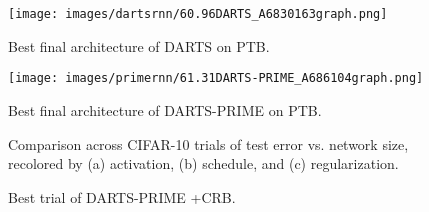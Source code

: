 \documentclass[letterpaper]{article} \usepackage{aaai22}  \usepackage{times}  \usepackage{helvet}  \usepackage{courier}  \usepackage[hyphens]{url}  \usepackage{graphicx} \urlstyle{rm} \def\UrlFont{\rm}  \usepackage{natbib}  \usepackage{caption} \DeclareCaptionStyle{ruled}{labelfont=normalfont,labelsep=colon,strut=off} \frenchspacing  \setlength{\pdfpagewidth}{8.5in}  \setlength{\pdfpageheight}{11in}  \usepackage{algorithm}
\begin{document}
\begin{figure}[thp!]
\texttt{[image: images/dartsrnn/60.96DARTS\_A6830163graph.png]}
\caption{Best final architecture of DARTS on PTB.} \label{fig:dartsrnn}
\end{figure}

\begin{figure}[thp!]
\texttt{[image: images/primernn/61.31DARTS-PRIME\_A686104graph.png]}
\caption{Best final architecture of DARTS-PRIME on PTB.} \label{fig:primernn}
\end{figure}

\begin{figure}[b!]
\centering
\begin{minipage}{\linewidth}
\centering
{} 
\end{minipage}\par
\begin{minipage}{\linewidth}
\centering
{} 
\end{minipage}\par
\begin{minipage}{\linewidth}
\centering
{} 
\end{minipage}\par
\caption{Comparison across CIFAR-10 trials of test error vs. network size, recolored by (a) activation, (b) schedule, and (c) regularization. } \label{fig:scatter}
\end{figure}


\begin{figure}[thp!]
\begin{minipage}{\linewidth}
\centering
{}
\end{minipage}\par
\begin{minipage}{\linewidth}
\centering
{}
\end{minipage}\par
\begin{minipage}{.49\linewidth}
\centering
{}
\end{minipage}
\begin{minipage}{.49\linewidth}
\centering
{}
\end{minipage}
\caption{Best trial of DARTS-PRIME +CRB.}
\label{fig:pfc}
\end{figure}
\end{document}
